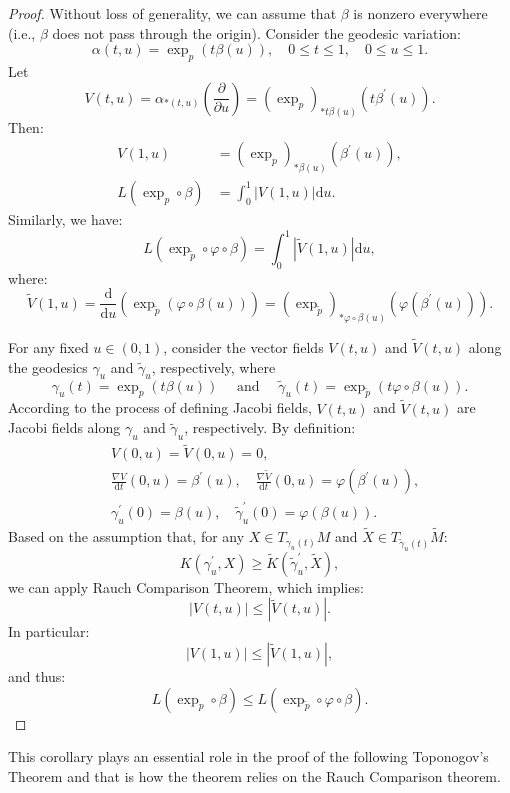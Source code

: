 \documentclass{ctexart}
\begin{document}
\begin{proof}[Proof]
  Without loss of generality, we can assume that $\beta$ is nonzero everywhere (i.e., $\beta$ does not pass through the origin).
  Consider the geodesic variation:
  $$
  \alpha(t, u) = \exp_p(t \beta(u)), \quad 0 \leq t \leq 1, \quad 0 \leq u \leq 1.
  $$
  Let
  $$
  V(t, u) = \alpha_{*(t, u)}\left(\frac{\partial}{\partial u}\right) = \left(\exp_p\right)_{* t \beta(u)}\left(t \beta^{\prime}(u)\right).
  $$
  Then:
  $$
  \begin{aligned}
  V(1, u)  &= \left(\exp_p\right)_{* \beta(u)}\left(\beta^{\prime}(u)\right), \\
  L\left(\exp_p \circ \beta\right) &= \int_0^1|V(1, u)| \mathrm{d} u.
  \end{aligned}
  $$
  Similarly, we have:
  $$
  L\left(\exp_{\tilde{p}} \circ \varphi \circ \beta\right) = \int_0^1|\tilde{V}(1, u)| \mathrm{d} u,
  $$
  where:
  $$
  \tilde{V}(1, u) = \frac{\mathrm{d}}{\mathrm{d} u}\left(\exp_{\tilde{p}}(\varphi \circ \beta(u))\right) = \left(\exp_{\tilde{p}}\right)_{* \varphi \circ \beta(u)}\left(\varphi\left(\beta^{\prime}(u)\right)\right).
  $$

  For any fixed $u \in (0,1)$, consider the vector fields $V(t, u)$ and $\tilde{V}(t, u)$ along the geodesics $\gamma_u$ and $\tilde{\gamma}_u$, respectively, where
  $$
  \gamma_u(t) = \exp_p(t \beta(u)) \quad \text{ and } \quad \tilde{\gamma}_u(t) = \exp_{\tilde{p}}(t \varphi \circ \beta(u)). 
  $$
  According to the process of defining Jacobi fields, $V(t, u)$ and $\tilde{V}(t, u)$ are Jacobi fields along $\gamma_u$ and $\tilde{\gamma}_u$, respectively. By definition:
  $$
  \begin{aligned}
  & V(0, u) = \tilde{V}(0, u) = 0, \\
  & \frac{\nabla V}{\mathrm{d} t}(0, u) = \beta^{\prime}(u), \quad \frac{\nabla \tilde{V}}{\mathrm{d} t}(0, u) = \varphi\left(\beta^{\prime}(u)\right), \\
  & \gamma_u^{\prime}(0) = \beta(u), \quad \tilde{\gamma}_u^{\prime}(0) = \varphi(\beta(u)).
  \end{aligned}
  $$
  Based on the assumption that, for any $X \in T_{\gamma_u(t)} M$ and $\tilde{X} \in T_{\tilde{\gamma}_u(t)} \tilde{M}$:
  $$
  K\left(\gamma_u^{\prime}, X\right) \geq \tilde{K}\left(\tilde{\gamma}_u^{\prime}, \tilde{X}\right),
  $$
  we can apply Rauch Comparison Theorem, which implies:
  $$
  |V(t, u)| \leq |\tilde{V}(t, u)|.
  $$
  In particular:
  $$
  |V(1, u)| \leq |\tilde{V}(1, u)|,
  $$
  and thus:
  $$
  L\left(\exp_p \circ \beta\right) \leq L\left(\exp_{\tilde{p}} \circ \varphi \circ \beta\right).
  $$
\end{proof}
This corollary plays an essential role in the proof of the following Toponogov's Theorem and that is how the theorem relies on the Rauch Comparison theorem. 
\end{document}
